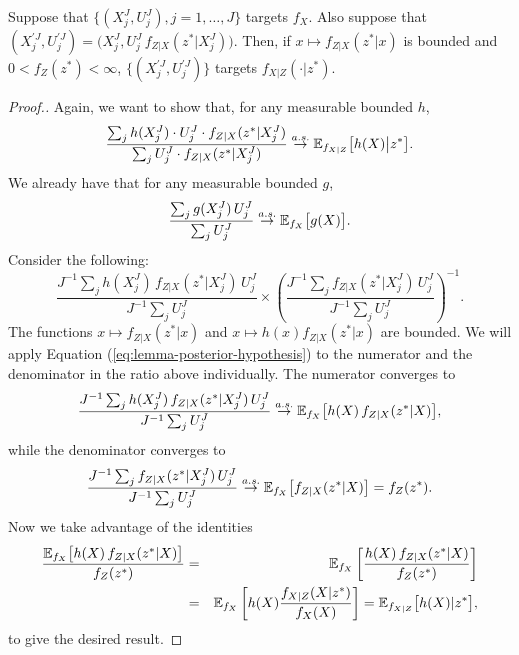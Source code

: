 \documentclass[11pt]{article}
\theoremstyle{thmstylethree}%
\begin{document}
\begin{lem}
    \label{lem:posterior-proper-weights}
    Suppose that $\{(X_j^J,U_j^J),j=1,\dots,J\}$ targets $f_X$.
    Also suppose that $(X^{\prime J}_j,U^{\prime J}_j) = \big(X_j^J,U_j^J \, f_{Z|X}(z^*|X_j^J)\big)$. 
    Then, if $x\mapsto f_{Z|X}(z^*|x)$ is bounded and $0<f_Z(z^*)<\infty$, $\{(X^{\prime J}_j,U^{\prime J}_j)\}$ targets $f_{X|Z}(\cdot | z^*)$.
\end{lem}

\begin{proof}[Proof.]
    Again, we want to show that, for any measurable bounded $h$,
     \begin{equation}
     \frac{\sum_j h(X_j^J) \cdot U_j^J \cdot f_{Z|X}(z^*|X_j^J)}{\sum_j U_j^J \cdot f_{Z|X}(z^*|X_j^J)} \stackrel{a.s.}{\to} \mathbb{E}_{f_{X|Z}}\big[h(X)\big|z^*\big].
     \end{equation}
    We already have that for any measurable bounded $g$,
    \begin{equation}
        \frac{\sum_j g(X_j^J)\, U_j^J}{\sum_j U_j^J} \stackrel{a.s.}{\to} \mathbb{E}_{f_X}\big[g(X)\big].
        \label{eq:lemma-posterior-hypothesis}
    \end{equation}
    Consider the following:
    \begin{equation}
    \frac{J^{-1} \sum_j h(X_j^J) \, f_{Z|X}(z^*|X_j^J)\,  {U}_j^{J}}{J^{-1} \sum_j {U}_j^{J}}
    \times \left( \frac{J^{-1} \sum_j f_{Z|X}(z^*|X_j^J) \, {U}_j^{J}}{J^{-1} \sum_j {U}_j^{J}} \right)^{-1}.
    \end{equation}
    The functions $x\mapsto f_{Z|X}(z^*|x)$ and $x\mapsto h(x)f_{Z|X}(z^*|x)$ are bounded.
    We will apply Equation (\ref{eq:lemma-posterior-hypothesis}) to the numerator and the denominator in the ratio above individually. The numerator converges to 
    \begin{equation}
    \frac{J^{-1} \sum_j h(X_j^J) \, f_{Z|X}(z^*|X_j^J) \, {U}_j^{J}}{J^{-1} \sum_j {U}_j^{J}} \stackrel{a.s.}{\to} \mathbb{E}_{f_X}\big[h(X)\, f_{Z|X}(z^*|X)\big],
    \end{equation}
    while the denominator converges to
    \begin{equation} 
    \frac{J^{-1} \sum_j f_{Z|X}(z^*|X_j^J) \, {U}_j^{J}}{J^{-1} \sum_j {U}_j^{J}}  \stackrel{a.s.}{\to} \mathbb{E}_{f_X}\big[f_{Z|X}(z^*|X)\big] = f_Z(z^*).
    \end{equation}
    Now we take advantage of the identities
    \begin{eqnarray}
    \frac{\mathbb{E}_{f_X}\big[h(X)\, f_{Z|X}(z^*|X)\big]}{f_Z(z^*)} &=& \mathbb{E}_{f_X}\left[\frac{h(X)\, f_{Z|X}(z^*|X)}{f_Z(z^*)}\right] 
    \\
    &=& \mathbb{E}_{f_X}\left[h(X)\frac{f_{X|Z}(X|z^*)}{f_X(X)}\right] =  \mathbb{E}_{f_{X|Z}}\big[h(X)|z^*\big],
    \end{eqnarray}
    to give the desired result.
    

\end{proof}
\end{document}
